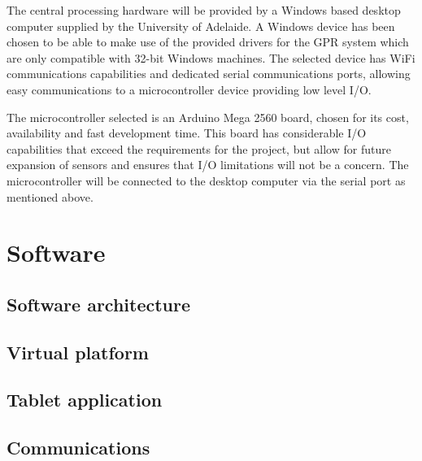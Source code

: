 \documentclass[main.tex]{subfiles}
\begin{document}
The central processing hardware will be provided by a Windows based desktop computer supplied by the University of Adelaide. A Windows device has been chosen to be able to make use of the provided drivers for the GPR system which are only compatible with 32-bit Windows machines. The selected device has WiFi communications capabilities and dedicated serial communications ports, allowing easy communications to a microcontroller device providing low level I/O.

The microcontroller selected is an Arduino Mega 2560 board, chosen for its cost, availability and fast development time. This board has considerable I/O capabilities that exceed the requirements for the project, but allow for future expansion of sensors and ensures that I/O limitations will not be a concern. The microcontroller will be connected to the desktop computer via the serial port as mentioned above.

\section{Software}

\subsection{Software architecture}

\subsection{Virtual platform}

\subsection{Tablet application}

\subsection{Communications}
\end{document}
